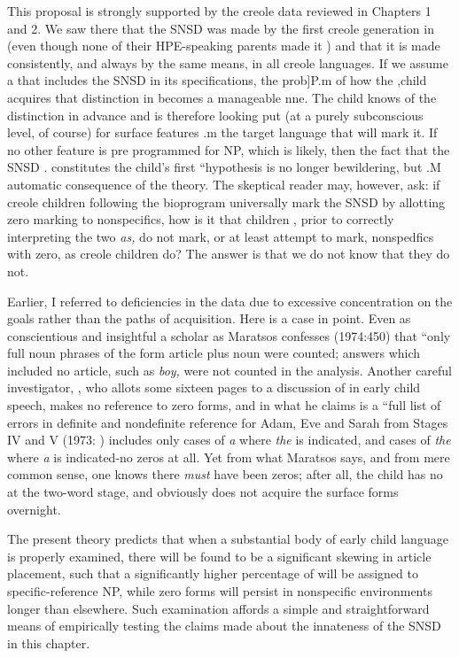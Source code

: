 This proposal is strongly supported by the creole data reviewed in Chapters 1 and 2. We saw there that the SNSD was made by the first creole generation in  (even though none of their HPE-speaking parents made it ) and that it is made consistently, and always by the same means, in all creole languages. If we assume a  that includes the SNSD in its specifications, the prob]P.m of how the
,child acquires that distinction in  becomes a manageable nne. The child knows of the distinction in advance and is therefore looking put (at a purely subconscious level, of course) for surface features
.m the target language that will mark it. If no other feature is pre\-
programmed for NP, which is likely, then the fact that the SNSD
. constitutes the child's first ``hypothesis is no longer bewildering, but
.M automatic consequence of the theory.
The skeptical reader may, however, ask: if creole children follow\-ing the bioprogram universally mark the SNSD by allotting zero marking to nonspecifics, how is it that children  , prior to
correctly interpreting the two \textit{as,} do not mark, or at least attempt to mark, nonspedfics with zero, as creole children do? The answer is that we do not know that they do not.

Earlier, I referred to deficiencies in the data due to excessive
concentration on the goals rather than the paths of acquisition. Here is a case in point. Even as conscientious and insightful a scholar as Maratsos confesses (1974:450) that ``only full noun phrases of the form article plus noun were counted; answers which included no article, such as \textit{boy, }were not counted in the analysis. Another careful inves\-tigator, \citet{Brown1973}, who allots some sixteen pages to a discussion of  in early child speech, makes no reference to zero forms, and in what he claims is a ``full list of errors in definite and nondefinite reference for Adam, Eve and Sarah from Stages IV and V (1973: ) includes only cases of \textit{a} where \textit{the} is indicated, and cases of \textit{the} where \textit{a} is indicated-no zeros at all. Yet from what Maratsos says, and from mere common sense, one knows there \textit{must} have been zeros; after all, the child has no  at the two-word stage, and obviously does not acquire the surface forms overnight.

The present theory predicts that when a substantial body of early child language is properly examined, there will be found to be a significant skewing in article placement, such that a significantly higher percentage of  will be assigned to specific-reference NP, while zero forms will persist in nonspecific environments longer than elsewhere. Such examination affords a simple and straightforward means of empirically testing the claims made about the innateness of the SNSD in this chapter.

